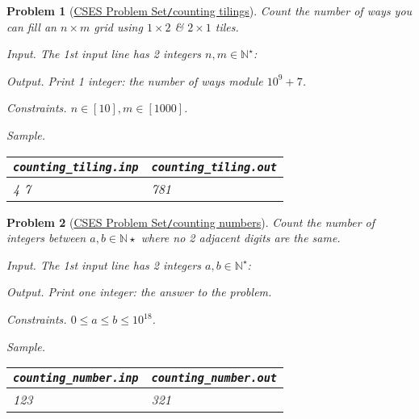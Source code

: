 \documentclass{article}
\newtheorem{problem}{Problem}
\begin{document}
\begin{problem}[\href{https://cses.fi/problemset/task/2181}{CSES Problem Set{\tt/}counting tilings}]
	Count the number of ways you can fill an $n\times m$ grid using $1\times2$ \& $2\times1$ tiles.
	\item {\sf Input.} The 1st input line has 2 integers $n,m\in\mathbb{N}^\star$: 
	\item {\sf Output.} Print 1 integer: the number of ways module $10^9 + 7$.
	\item {\sf Constraints.} $n\in[10],m\in[1000]$.
	\item {\sf Sample.}
	\begin{table}[H]
		\centering
		\begin{tabular}{|l|l|}
			\hline
			\verb|counting_tiling.inp| & \verb|counting_tiling.out| \\
			\hline
			4 7 & 781 \\
			\hline
		\end{tabular}
	\end{table}
\end{problem}

\begin{problem}[\href{https://cses.fi/problemset/task/2220}{CSES Problem Set{\tt/}counting numbers}]
	Count the number of integers between $a,b\in\mathbb{N}\star$ where no 2 adjacent digits are the same.
	\item {\sf Input.} The 1st input line has 2 integers $a,b\in\mathbb{N}^\star$: 
	\item {\sf Output.} Print one integer: the answer to the problem.
	\item {\sf Constraints.} $0\le a\le b\le10^{18}$.
	\item {\sf Sample.}
	\begin{table}[H]
		\centering
		\begin{tabular}{|l|l|}
			\hline
			\verb|counting_number.inp| & \verb|counting_number.out| \\
			\hline
			123 & 321 \\
			\hline
		\end{tabular}
	\end{table}
\end{problem}
\end{document}
